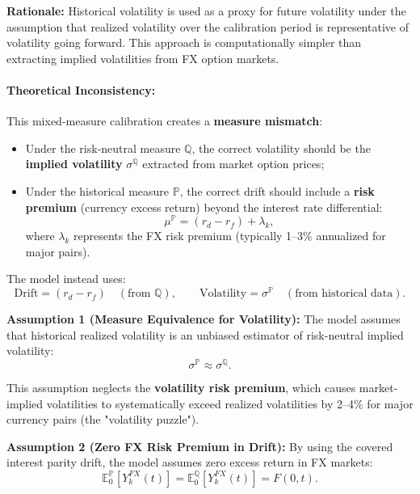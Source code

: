 \textbf{Rationale:} Historical volatility is used as a proxy for future volatility under the assumption that realized volatility over the calibration period is representative of volatility going forward. This approach is computationally simpler than extracting implied volatilities from FX option markets.

\paragraph{Theoretical Inconsistency:}
This mixed-measure calibration creates a \textbf{measure mismatch}:
\begin{itemize}
	\item Under the risk-neutral measure $\mathbb{Q}$, the correct volatility should be the \textbf{implied volatility} $\sigma^{\mathbb{Q}}$ extracted from market option prices;
	\item Under the historical measure $\mathbb{P}$, the correct drift should include a \textbf{risk premium} (currency excess return) beyond the interest rate differential:
	\begin{equation}
		\mu^{\mathbb{P}} = (r_d - r_f) + \lambda_k,
	\end{equation}
	where $\lambda_k$ represents the FX risk premium (typically 1--3\% annualized for major pairs).
\end{itemize}

The model instead uses:
\begin{equation}
	\text{Drift} = (r_d - r_f) \quad (\text{from } \mathbb{Q}), \qquad \text{Volatility} = \sigma^{\mathbb{P}} \quad (\text{from historical data}).
\end{equation}

\textbf{Assumption 1 (Measure Equivalence for Volatility):} The model assumes that historical realized volatility is an unbiased estimator of risk-neutral implied volatility:
\begin{equation}
	\sigma^{\mathbb{P}} \approx \sigma^{\mathbb{Q}}.
\end{equation}

This assumption neglects the \textbf{volatility risk premium}, which causes market-implied volatilities to systematically exceed realized volatilities by 2--4\% for major currency pairs (the "volatility puzzle").

\textbf{Assumption 2 (Zero FX Risk Premium in Drift):} By using the covered interest parity drift, the model assumes zero excess return in FX markets:
\begin{equation}
	\mathbb{E}^{\mathbb{P}}_0\left[Y_k^{FX}(t)\right] = \mathbb{E}^{\mathbb{Q}}_0\left[Y_k^{FX}(t)\right] = F(0,t).
\end{equation}

